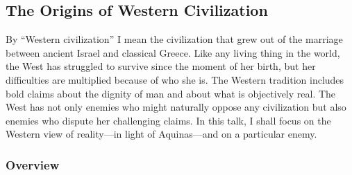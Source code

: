 \documentclass[twocolumn]{article}
\begin{document}
\subsection{The Origins of Western Civilization}

By ``Western civilization'' I mean the civilization that grew out of the
marriage between ancient Israel and classical Greece.  Like any living thing in
the world, the West has struggled to survive since the moment of her birth, but
her difficulties are multiplied because of who she is.  The Western tradition
includes bold claims about the dignity of man and about what is objectively
real.  The West has not only enemies who might naturally oppose any
civilization but also enemies who dispute her challenging claims.  In this
talk, I shall focus on the Western view of reality---in light of Aquinas---and
on a particular enemy.

\subsubsection{Overview}
\end{document}
